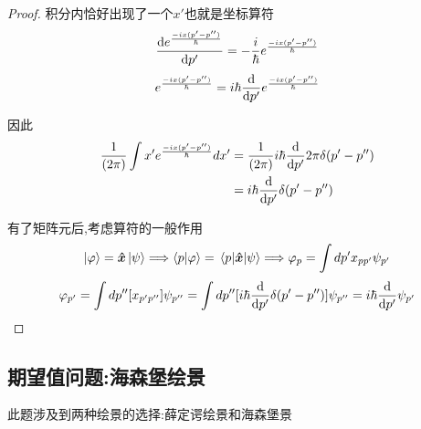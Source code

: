 \documentclass{article}
\begin{document}
\begin{formal}
\begin{proof}
                    积分内恰好出现了一个$x'$也就是坐标算符
                    $$ \dv{e^{\frac{-ix(p'-p'')}{\hbar}}}{p'} = -\frac{i}{\hbar} e^{\frac{-ix(p'-p'')}{\hbar}}$$
                    $$ e^{\frac{-ix(p'-p'')}{\hbar}} = i\hbar \dv{}{p'} e^{\frac{-ix(p'-p'')}{\hbar}}$$
                    
                    因此
                    \begin{align*}
                         \frac{1}{(2 \pi)} \int x' e^{\frac{-ix(p'-p'')}{\hbar}}   dx' &=  \frac{1}{(2 \pi)}  i\hbar \dv{}{p'} 2\pi \delta(p'-p'')    \\
                                                                                      &= i \hbar \dv{}{p'} \delta(p'-p'')                          \\                                   
                    \end{align*}
    
                    有了矩阵元后,考虑算符的一般作用
                    $$ \ket{\varphi} = \vu*{x} \ket{\psi} \Longrightarrow \braket{p}{\varphi}=\mel{p}{\vu*{x}}{\psi} \Longrightarrow \varphi_{p} = \int dp' x_{pp'} \psi_{p'}$$
                    $$ \varphi_{p'} =  \int dp'' [x_{p'p''}] \psi_{p''} = \int dp'' [i \hbar \dv{}{p'} \delta(p'-p'')] \psi_{p''} = i\hbar \dv{}{p'} \psi_{p'} $$
    
                    
                
                \end{proof}
            \end{formal}
            


        \subsection{期望值问题:海森堡绘景}
            此题涉及到两种绘景的选择:薛定谔绘景和海森堡景
            
\end{document}
